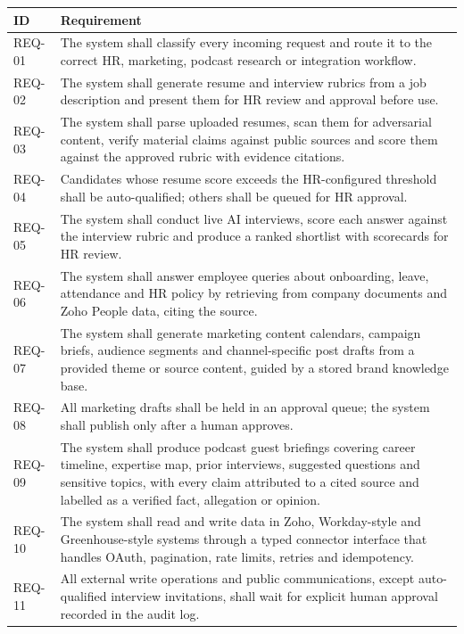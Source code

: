 \renewcommand{\arraystretch}{0.96}
\noindent\begin{tabular}{|p{}|p{}|}
\hline
\textbf{ID} & \textbf{Requirement} \\ \hline
REQ-01 & The system shall classify every incoming request and route it to the correct HR, marketing, podcast research or integration workflow. \\ \hline
REQ-02 & The system shall generate resume and interview rubrics from a job description and present them for HR review and approval before use. \\ \hline
REQ-03 & The system shall parse uploaded resumes, scan them for adversarial content, verify material claims against public sources and score them against the approved rubric with evidence citations. \\ \hline
REQ-04 & Candidates whose resume score exceeds the HR-configured threshold shall be auto-qualified; others shall be queued for HR approval. \\ \hline
REQ-05 & The system shall conduct live AI interviews, score each answer against the interview rubric and produce a ranked shortlist with scorecards for HR review. \\ \hline
REQ-06 & The system shall answer employee queries about onboarding, leave, attendance and HR policy by retrieving from company documents and Zoho People data, citing the source. \\ \hline
REQ-07 & The system shall generate marketing content calendars, campaign briefs, audience segments and channel-specific post drafts from a provided theme or source content, guided by a stored brand knowledge base. \\ \hline
REQ-08 & All marketing drafts shall be held in an approval queue; the system shall publish only after a human approves. \\ \hline
REQ-09 & The system shall produce podcast guest briefings covering career timeline, expertise map, prior interviews, suggested questions and sensitive topics, with every claim attributed to a cited source and labelled as a verified fact, allegation or opinion. \\ \hline
REQ-10 & The system shall read and write data in Zoho, Workday-style and Greenhouse-style systems through a typed connector interface that handles OAuth, pagination, rate limits, retries and idempotency. \\ \hline
REQ-11 & All external write operations and public communications, except auto-qualified interview invitations, shall wait for explicit human approval recorded in the audit log. \\ \hline
\end{tabular}

